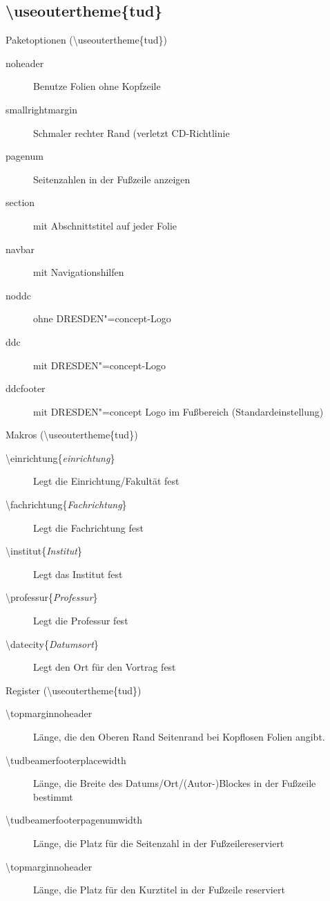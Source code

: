 \documentclass[presentation,t]{beamer}
\begin{document}
\subsection{\textbackslash useoutertheme\{tud\}}
\label{sec:org253b1e8}
\begin{frame}[label={sec:org8f5dd1e}]{Paketoptionen (\textbackslash useoutertheme\{tud\})}
\begin{description}
\item[{noheader}] Benutze Folien ohne Kopfzeile
\item[{smallrightmargin}] Schmaler rechter Rand (verletzt CD-Richtlinie
\item[{pagenum}] Seitenzahlen in der Fußzeile anzeigen
\item[{section}] mit Abschnittstitel auf jeder Folie
\item[{navbar}] mit Navigationshilfen
\item[{noddc}] ohne DRESDEN"=concept-Logo
\item[{ddc}] mit DRESDEN"=concept-Logo
\item[{ddcfooter}] mit DRESDEN"=concept Logo im Fußbereich (Standardeinstellung)
\end{description}
\end{frame}
\begin{frame}[label={sec:orgc738b4a}]{Makros (\textbackslash useoutertheme\{tud\})}
\begin{description}
\item[{\textbackslash einrichtung\{\emph{einrichtung}\}}] Legt die
Einrichtung/Fakultät fest
\item[{\textbackslash fachrichtung\{\emph{Fachrichtung}\}}] Legt die
Fachrichtung fest
\item[{\textbackslash institut\{\emph{Institut}\}}] Legt das
Institut fest
\item[{\textbackslash professur\{\emph{Professur}\}}] Legt die
Professur fest
\item[{\textbackslash datecity\{\emph{Datumsort}\}}] Legt den Ort für den Vortrag fest
\end{description}
\end{frame}
\begin{frame}[label={sec:org3a37624}]{Register (\textbackslash useoutertheme\{tud\})}
\begin{description}
\item[{\textbackslash topmarginnoheader}] Länge, die den Oberen Rand Seitenrand bei
Kopflosen Folien angibt.
\item[{\textbackslash tudbeamerfooterplacewidth}] Länge, die Breite des
Datums/Ort/(Autor-)Blockes in der Fußzeile bestimmt
\item[{\textbackslash tudbeamerfooterpagenumwidth}] Länge, die Platz für
die Seitenzahl in der Fußzeilereserviert
\item[{\textbackslash topmarginnoheader}] Länge, die Platz für den
Kurztitel in der Fußzeile reserviert
\end{description}
\end{frame}
\end{document}
